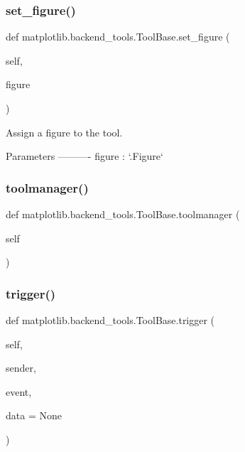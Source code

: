 \subsubsection{\texorpdfstring{set\+\_\+figure()}{set\_figure()}}
{\footnotesize\ttfamily def matplotlib.\+backend\+\_\+tools.\+Tool\+Base.\+set\+\_\+figure (\begin{DoxyParamCaption}\item[{}]{self,  }\item[{}]{figure }\end{DoxyParamCaption})}

\begin{DoxyVerb}Assign a figure to the tool.

Parameters
----------
figure : `.Figure`
\end{DoxyVerb}
 \mbox{\label{classmatplotlib_1_1backend__tools_1_1ToolBase_aa7888dab7ba0552f93037f1df4b192f6}} 
\subsubsection{\texorpdfstring{toolmanager()}{toolmanager()}}
{\footnotesize\ttfamily def matplotlib.\+backend\+\_\+tools.\+Tool\+Base.\+toolmanager (\begin{DoxyParamCaption}\item[{}]{self }\end{DoxyParamCaption})}

\mbox{\label{classmatplotlib_1_1backend__tools_1_1ToolBase_a789005a8a3c42ec7b0d5a31a9e7e12ae}} 
\subsubsection{\texorpdfstring{trigger()}{trigger()}}
{\footnotesize\ttfamily def matplotlib.\+backend\+\_\+tools.\+Tool\+Base.\+trigger (\begin{DoxyParamCaption}\item[{}]{self,  }\item[{}]{sender,  }\item[{}]{event,  }\item[{}]{data = {\ttfamily None} }\end{DoxyParamCaption})}

